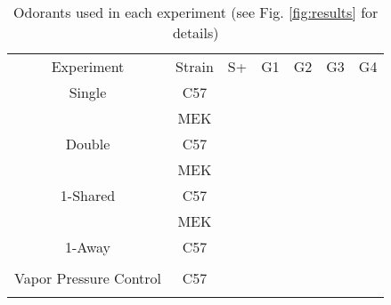 \label{tab:design}
\begin{table}
    \begin{tabular}{ c c c c c c c }
        Experiment & Strain & S+ & G1 & G2 & G3 & G4 \\ 
        Single & C57 &  &  &  &  &   \\ 
         & MEK &  &  &  &  &  \\ 
        Double & C57 &  &  &  &  &    \\ 
         & MEK &  &  &  &  &   \\ 
        1-Shared & C57 &  &  &  &  &  \\ 
         & MEK &  &  &  &  &   \\ 
        1-Away & C57 &  &  &  &  &    \\ 
         &  & &  &  &  &  \\ 
        Vapor Pressure Control & C57 &  &  &  &  &   \\ 
        &  &  &  &  &  &   \\ 
    \end{tabular}
    \caption{Odorants used in each experiment (see Fig. \ref{fig:results} for details)}
\end{table}